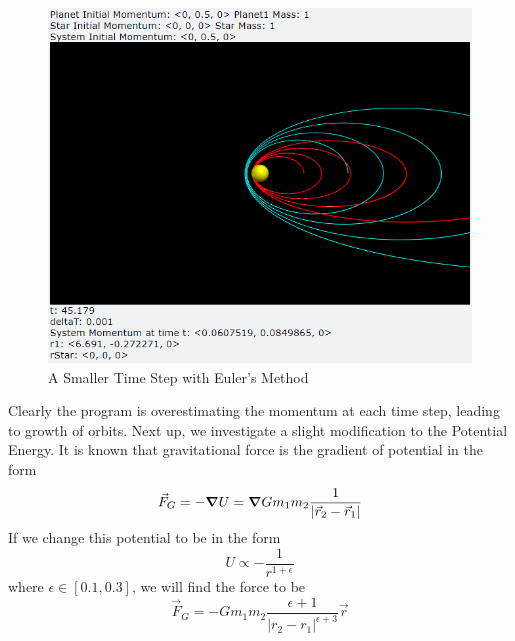 \documentclass[12pt]{article}
\begin{document}
\begin{enumerate}
        \begin{figure}[h]
            \begin{center}
               \includegraphics[scale=.5]{TwoBody5.png}
               \caption{A Smaller Time Step with Euler's Method}
               \label{fig:TwoBody5}
            \end{center}
        \end{figure}
        \noindent
        Clearly the program is overestimating the momentum at each time step, leading to growth of orbits. 
        \newline
        Next up, we investigate a slight modification to the Potential Energy. It is known that gravitational 
        force is the gradient of potential in the form
        \begin{equation}
            \vec{F}_G = -\grad U = \grad Gm_1m_2\frac{1}{|\vec{r}_2-\vec{r}_1|}
            \label{eqn:ForceGradU}
        \end{equation}
        If we change this potential to be in the form 
        \begin{equation*}
            U \propto -\frac{1}{r^{1+\epsilon}}
        \end{equation*}
        where $\epsilon \in [0.1, 0.3]$, we will find the force to be 
        \begin{equation}
                \vec{F}_G = -Gm_1m_2\frac{\epsilon+1}{|r_2-r_1|^{\epsilon+3}}\vec{r}
                \label{eqn:AdjustedPotentialForce}
        \end{equation}

\end{enumerate}
\end{document}
